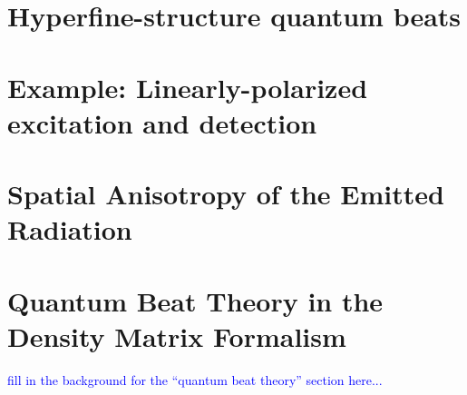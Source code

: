 \documentclass[11pt]{article}
\begin{document}
\section{Hyperfine-structure quantum beats}




\section{Example: Linearly-polarized excitation and detection}



\section{Spatial Anisotropy of the Emitted Radiation}



\appendix

\section{Quantum Beat Theory in the Density Matrix Formalism \cite{haroche}}\label{app:quantum_beats}

\textcolor{blue}{fill in the background for the ``quantum beat theory'' section here...}






\end{document}
